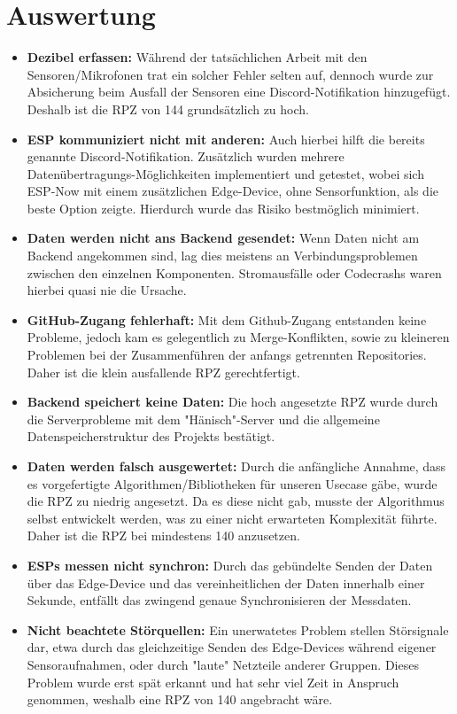 \section{Auswertung}

\begin{itemize}
    \item \textbf{Dezibel erfassen:}
    Während der tatsächlichen Arbeit mit den Sensoren/Mikrofonen trat ein solcher Fehler selten auf, dennoch wurde zur Absicherung beim Ausfall der Sensoren eine Discord-Notifikation hinzugefügt. Deshalb ist die RPZ von 144 grundsätzlich zu hoch.
    \item \textbf{ESP kommuniziert nicht mit anderen:}
    Auch hierbei hilft die bereits genannte Discord-Notifikation. Zusätzlich wurden mehrere Datenübertragungs-Möglichkeiten implementiert und getestet, wobei sich ESP-Now mit einem zusätzlichen Edge-Device, ohne Sensorfunktion, als die beste Option zeigte. Hierdurch wurde das Risiko bestmöglich minimiert. 
    \item \textbf{Daten werden nicht ans Backend gesendet:}
    Wenn Daten nicht am Backend angekommen sind, lag dies meistens an Verbindungsproblemen zwischen den einzelnen Komponenten. Stromausfälle oder Codecrashs waren hierbei quasi nie die Ursache.
    \item \textbf{GitHub-Zugang fehlerhaft:}
    Mit dem Github-Zugang entstanden keine Probleme, jedoch kam es gelegentlich zu Merge-Konflikten, sowie zu kleineren Problemen bei der Zusammenführen der anfangs getrennten Repositories. Daher ist die klein ausfallende RPZ gerechtfertigt.
    \item \textbf{Backend speichert keine Daten:}
    Die hoch angesetzte RPZ wurde durch die Serverprobleme mit dem "Hänisch"-Server und die allgemeine Datenspeicherstruktur des Projekts bestätigt. 
    \item \textbf{Daten werden falsch ausgewertet:}
    Durch die anfängliche Annahme, dass es vorgefertigte Algorithmen/Bibliotheken für unseren Usecase gäbe, wurde die RPZ zu niedrig angesetzt. Da es diese nicht gab, musste der Algorithmus selbst entwickelt werden, was zu einer nicht erwarteten Komplexität führte. Daher ist die RPZ bei mindestens 140 anzusetzen.
    \item \textbf{ESPs messen nicht synchron:}
    Durch das gebündelte Senden der Daten über das Edge-Device und das vereinheitlichen der Daten innerhalb einer Sekunde, entfällt das zwingend genaue Synchronisieren der Messdaten. 
    \item \textbf{Nicht beachtete Störquellen:}
    Ein unerwatetes Problem stellen Störsignale dar, etwa durch das gleichzeitige Senden des Edge-Devices während eigener Sensoraufnahmen, oder durch "laute"  Netzteile anderer Gruppen. Dieses Problem wurde erst spät erkannt und hat sehr viel Zeit in Anspruch genommen, weshalb eine RPZ von 140 angebracht wäre. 
\end{itemize}